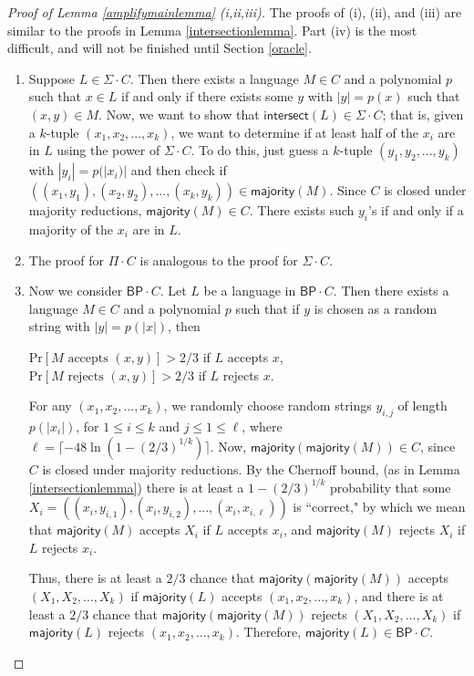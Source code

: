 \documentclass[11pt]{article}
\newcommand{\pr}{\text{Pr}}
\newcommand{\bp}{\textsf{BP}}
\newcommand{\intersect}{\textsf{intersect}}
\newcommand{\majority}{\textsf{majority}}
\begin{document}
\begin{proof}[Proof of Lemma \ref{amplifymainlemma} (i,ii,iii)]

 The proofs of (i), (ii), and (iii) are similar to the proofs in Lemma \ref{intersectionlemma}. Part (iv) is the most difficult, and will not be finished until Section \ref{oracle}.
\begin{enumerate}
\item[(i)] Suppose $L \in \Sigma \cdot C$. Then there exists a language $M \in C$ and a polynomial $p$ such that $x\in L$ if and only if there exists some $y$ with $|y| = p(x)$ such that $(x,y) \in M$. Now, we want to show that $\intersect(L) \in \Sigma \cdot C$; that is, given a $k$-tuple $(x_1,x_2,...,x_k)$, we want to determine if at least half of the $x_i$ are in $L$ using the power of $\Sigma \cdot C$. To do this, just guess a $k$-tuple $(y_1,y_2,...,y_k)$ with $|y_i| = p(|x_i)|$ and then check if $((x_1,y_1),(x_2,y_2),...,(x_k,y_k)) \in \majority(M)$. Since $C$ is closed under majority reductions, $\majority(M) \in C$. There exists such $y_i$'s if and only if a majority of the $x_i$ are in $L$.
\item[(ii)] The proof for $\Pi \cdot C$ is analogous to the proof for $\Sigma \cdot C$.
\item[(iii)] Now we consider $\bp \cdot C$. Let $L$ be a language in $\bp \cdot C$. Then there exists a language $M \in C$ and a polynomial $p$ such that if $y$ is chosen as a random string with $|y| = p(|x|)$, then
\begin{center}
$\pr[M\text{ accepts }(x,y)] > 2/3$ if $L$ accepts $x$,\\
$\pr[M\text{ rejects }(x,y)] > 2/3$ if $L$ rejects $x$.
\end{center}
For any $(x_1,x_2,...,x_k)$, we randomly choose random strings $y_{i,j}$ of length $p(|x_i|)$, for $1\le i\le k$ and $j\le 1\le \ell$, where $\ell = \lceil -48\ln(1 - (2/3)^{1/k}) \rceil$.
Now, $\majority(\majority(M)) \in C$, since $C$ is closed under majority reductions. By the Chernoff bound, (as in Lemma \ref{intersectionlemma}) there is at least a $1-(2/3)^{1/k}$ probability that some $X_i = ((x_i,y_{i,1}), (x_i, y_{i,2}),...,(x_i, x_{i,\ell}))$ is ``correct," by which we mean that $\majority(M)$ accepts $X_i$ if $L$ accepts $x_i$, and $\majority(M)$ rejects $X_i$ if $L$ rejects $x_i$.

Thus, there is at least a $2/3$ chance that $\majority(\majority(M))$ accepts $(X_1,X_2,...,X_k)$ if $\majority(L)$ accepts $(x_1,x_2,...,x_k)$, and there is at least a $2/3$ chance that $\majority(\majority(M))$ rejects $(X_1,X_2,...,X_k)$ if $\majority(L)$ rejects $(x_1,x_2,...,x_k)$. Therefore, $\majority(L) \in \bp \cdot C$.
\end{enumerate}
\end{proof}
\end{document}
